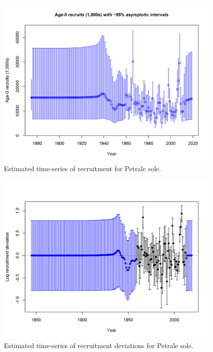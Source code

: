\documentclass[12pt,]{article}
\begin{document}
\FloatBarrier 

\begin{figure}[htbp]
\centering
\includegraphics{r4ss/plots_mod1/ts11_Age-0_recruits_(1000s)_with_95_asymptotic_intervals.png}
\caption{Estimated time-series of recruitment for Petrale sole.
\label{fig:recruits}}
\end{figure}

\FloatBarrier

\begin{figure}[htbp]
\centering
\includegraphics{r4ss/plots_mod1/recdevs2_withbars.png}
\caption{Estimated time-series of recruitment deviations for Petrale
sole. \label{fig:recdevs}}
\end{figure}
\end{document}
